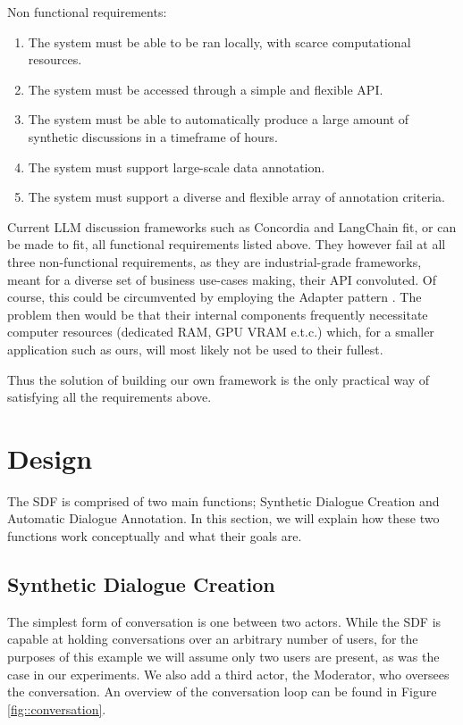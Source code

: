 Non functional requirements:
\begin{enumerate}
	\item The system must be able to be ran locally, with scarce computational resources.
	\item The system must be accessed through a simple and flexible API.
	\item The system must be able to automatically produce a large amount of synthetic discussions in a timeframe of hours.
	\item The system must support large-scale data annotation.
	\item The system must support a diverse and flexible array of annotation criteria.
\end{enumerate}

Current LLM discussion frameworks such as Concordia \cite{Vezhnevets2023GenerativeAM} and LangChain \cite{langchain} fit, or can be made to fit, all functional requirements listed above. They however fail at all three non-functional requirements, as they are industrial-grade frameworks, meant for a diverse set of business use-cases making, their API convoluted. Of course, this could be circumvented by employing the Adapter pattern \cite{gamma1995design}. The problem then would be that their internal components frequently necessitate computer resources (dedicated RAM, GPU VRAM e.t.c.) which, for a smaller application such as ours, will most likely not be used to their fullest.

Thus the solution of building our own framework is the only practical way of satisfying all the requirements above.



\section{Design}
\label{sec:system:design}

The SDF is comprised of two main functions; Synthetic Dialogue Creation and Automatic Dialogue Annotation. In this section, we will explain how these two functions work conceptually and what their goals are.


\subsection{Synthetic Dialogue Creation}
\label{ssec:creation}

The simplest form of conversation is one between two actors. While the SDF is capable at holding conversations over an arbitrary number of users, for the purposes of this example we will assume only two users are present, as was the case in our experiments. We also add a third actor, the Moderator, who oversees the conversation. An overview of the conversation loop can be found in Figure \ref{fig::conversation}.

